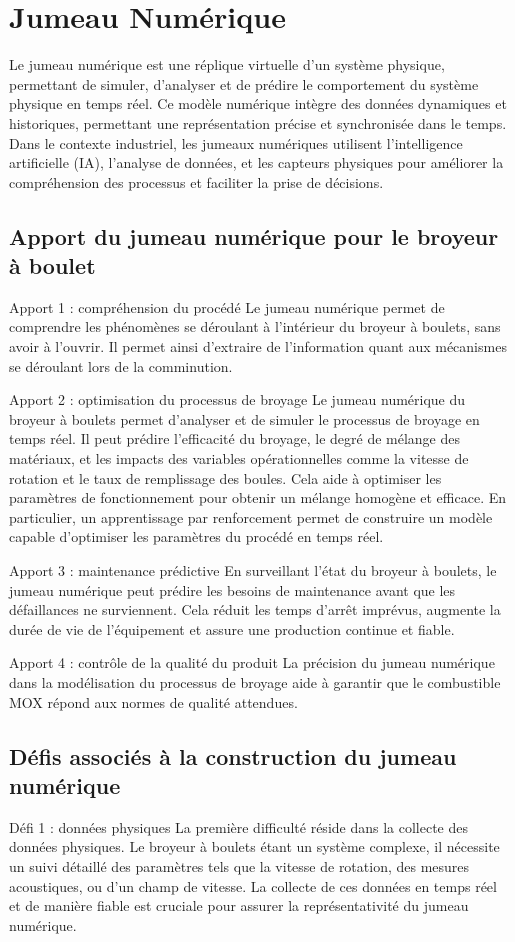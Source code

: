 \section{Jumeau Numérique}

Le jumeau numérique est une réplique virtuelle d'un système physique, permettant de simuler, d'analyser et de prédire le comportement du système physique en temps réel. Ce modèle numérique intègre des données dynamiques et historiques, permettant une représentation précise et synchronisée dans le temps. Dans le contexte industriel, les jumeaux numériques utilisent l'intelligence artificielle (IA), l'analyse de données, et les capteurs physiques pour améliorer la compréhension des processus et faciliter la prise de décisions.

\subsection{Apport du jumeau numérique pour le broyeur à boulet}
Apport 1 : compréhension du procédé
Le jumeau numérique permet de comprendre les phénomènes se déroulant à l'intérieur du broyeur à boulets, sans avoir à l'ouvrir. Il permet ainsi d'extraire de l'information quant aux mécanismes se déroulant lors de la comminution.

Apport 2 : optimisation du processus de broyage
Le jumeau numérique du broyeur à boulets permet d'analyser et de simuler le processus de broyage en temps réel. Il peut prédire l'efficacité du broyage, le degré de mélange des matériaux, et les impacts des variables opérationnelles comme la vitesse de rotation et le taux de remplissage des boules. Cela aide à optimiser les paramètres de fonctionnement pour obtenir un mélange homogène et efficace. En particulier, un apprentissage par renforcement permet de construire un modèle capable d'optimiser les paramètres du procédé en temps réel.

Apport 3 : maintenance prédictive
En surveillant l'état du broyeur à boulets, le jumeau numérique peut prédire les besoins de maintenance avant que les défaillances ne surviennent. Cela réduit les temps d'arrêt imprévus, augmente la durée de vie de l'équipement et assure une production continue et fiable.

Apport 4 : contrôle de la qualité du produit
La précision du jumeau numérique dans la modélisation du processus de broyage aide à garantir que le combustible MOX répond aux normes de qualité attendues.

\subsection{Défis associés à la construction du jumeau numérique}
Défi 1 : données physiques
La première difficulté réside dans la collecte des données physiques. Le broyeur à boulets étant un système complexe, il nécessite un suivi détaillé des paramètres tels que la vitesse de rotation, des mesures acoustiques, ou d'un champ de vitesse. La collecte de ces données en temps réel et de manière fiable est cruciale pour assurer la représentativité du jumeau numérique.

